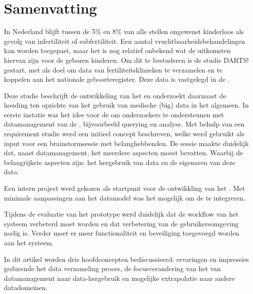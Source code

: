 \clearpage
{}
{}

\section*{Samenvatting}

In Nederland blijft tussen de 5\% en 8\% van alle stellen ongewenst kinderloos als gevolg van infertiliteit of subfertiliteit.
Een aantal vruchtbaarheidsbehandelingen kan worden toegepast, maar het is nog relatief onbekend wat de uitkomsten hiervan zijn voor de geboren kinderen.
Om dit te bestuderen is de studie DARTS! gestart, met als doel om data van fertiliteitsklinieken te verzamelen en te koppelen aan het nationale geboorteregister.
Deze data is vastgelegd in de \projectdata{}.

Deze studie beschrijft de ontwikkeling van het \ivfsystem{} en onderzoekt daarnaast de houding ten opzichte van het gebruik van medische (big) data in het algemeen.
In eerste instatie was het idee voor de \ivfsystem{} om onderzoekers te ondersteunen met datamanagement van de \projectdata{}, bijvoorbeeld querying en analyse.
Met behulp van een requirement studie werd een initieel concept beschreven, welke werd gebruikt als input voor een brainstormsessie met belanghebbenden.
De sessie maakte duidelijk dat, naast datamanagement, het \ivfsystem{} meerdere aspecten moest bevatten.
Waarbij de belangrijkste aspecten zijn: het hergebruik van data en de eigenaren van deze data.

Een intern project werd gekozen als startpunt voor de ontwikkling van het \ivfsystem{}.
Met minimale aanpassingen aan het datamodel was het mogelijk om de \projectdata{} te integreren.

Tijdens de evaluatie van het prototype werd duidelijk dat de workflow van het systeem verbeterd moet worden en dat verbetering van de gebruikersomgeving nodig is.
Verder moet er meer functionaliteit en beveiliging toegevoegd worden aan het systeem.

In dit artikel worden drie hoofdconcepten bediscussieerd: ervaringen en impressies gedurende het data verzameling proces, de focusverandering van het \ivfsystem{} van datamanagement naar data-hergebruik en mogelijke extrapolatie naar andere datadomeinen.